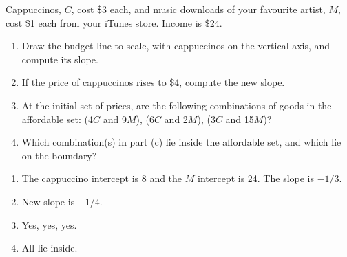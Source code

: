 \begin{enumialphparenastyle}
\begin{ex}\label{ex:ch6ex3}
Cappuccinos, $C$, cost \$3 each, and music downloads of your favourite artist, $M$, cost \$1 each from your iTunes store. Income is \$24.
\begin{enumerate}
	\item	Draw the budget line to scale, with cappuccinos on the vertical axis, and compute its slope.
	\item	If the price of cappuccinos rises to \$4, compute the new slope.
	\item	At the initial set of prices, are the following combinations of goods in the affordable set: (4$C$ and 9$M$), (6$C$ and 2$M$), (3$C$ and 15$M$)?
	\item	Which combination(s) in part (c) lie inside the affordable set, and which lie on the boundary? 
\end{enumerate}
\begin{sol}
\begin{enumerate}
	\item	The cappuccino intercept is 8 and the $M$ intercept is 24. The slope is $-1/3$.
	\item	New slope is $-1/4$.
	\item	Yes, yes, yes.
	\item	All lie inside.
\end{enumerate}
\end{sol}
\end{ex}


\end{enumialphparenastyle}
